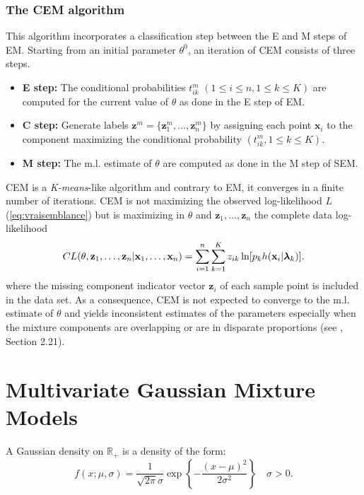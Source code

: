 \documentclass[a4paper,10pt]{article}
\newcommand{\R}{\mathbb{R}}
\newcommand{\bz}{\mathbf{z}}
\newcommand{\blambda}{\boldsymbol{\lambda}}
\begin{document}
\subsubsection{The CEM algorithm}
This algorithm incorporates a classification step between the E and M steps of EM. Starting
from an initial parameter $\theta^0$, an iteration of CEM consists of three steps.
\begin{itemize}
\item {\bf E step:} The conditional probabilities $t^m_{ik}$ $(1 \leq i \leq n, 1 \leq k \leq
  K)$ are computed for the current value of $\theta$ as done in the E step of EM.
\item {\bf C step:} Generate labels ${\bz}^m=\{ {\bz}^m_1,...,{\bz}^m_n\}$ by assigning each
  point ${\mathbf x}_i$ to the component maximizing the conditional probability
  $(t^m_{ik}, 1 \leq k \leq K)$.
\item {\bf M step:} The m.l. estimate of $\theta$ are computed as done in the M step of SEM.
\end{itemize}
CEM is a {\em K-means}-like algorithm and contrary to EM, it converges in a finite number of
iterations. CEM is not maximizing the observed log-likelihood $L$ (\ref{eq:vraisemblance}) but
is maximizing in $\theta$ and $\bz_{1},\ldots,\bz_{n}$ the complete data log-likelihood
\begin{equation} \label{cl}
  CL(\theta, {\bf z}_{1},\ldots,{\bf z}_{n}|{\bf
    x}_{1},\ldots,{\bf x}_{n}) = \sum_{i=1}^n\sum_{k=1}^{K}
  z_{ik}\ln[p_{k} h({\bf x}_i|\blambda_k)].
\end{equation}
where the missing component indicator vector $\bz_i$ of each sample point is
included in the data set. As a consequence, CEM is not expected to converge to the m.l.
estimate of $\theta$ and yields inconsistent estimates of the parameters especially when the
mixture components are overlapping or are in disparate proportions (see \cite{McLachlanPeel00}, Section 2.21).


\section{Multivariate Gaussian Mixture Models}

A Gaussian density on $\R_+$ is a density of the form:
\begin{equation}\label{law::gaussian-density}
f(x;\mu,\sigma) = \frac{1}{\sqrt{2\pi} \sigma} \exp\left\{- \frac{(x-\mu)^2}{2\sigma^2}\right\} \quad \sigma>0.
\end{equation}
\end{document}
